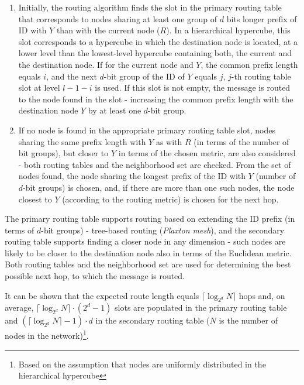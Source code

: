 \begin{enumerate}

\item Initially, the routing algorithm finds the slot in the primary routing table that corresponds to nodes sharing at least one group of $d$ bits longer prefix of ID with $Y$ than with the current node ($R$). In a hierarchical hypercube, this slot corresponds to a hypercube in which the destination node is located, at a lower level than the lowest-level hypercube containing both, the current and the destination node. If for the current node and $Y$, the common prefix length equals $i$, and the next $d$-bit group of the ID of $Y$ equals $j$, $j$-th routing table slot at level $l - 1 - i$ is used. If this slot is not empty, the message is routed to the node found in the slot - increasing the common prefix length with the destination node $Y$ by at least one $d$-bit group.

\item If no node is found in the appropriate primary routing table slot, nodes sharing the same prefix length with $Y$ as with $R$ (in terms of the number of bit groups), but closer to $Y$ in terms of the chosen metric, are also considered - both routing tables and the neighborhood set are checked. From the set of nodes found, the node sharing the longest prefix of the ID with $Y$ (number of $d$-bit groups) is chosen, and, if there are more than one such nodes, the node closest to $Y$ (according to the routing metric) is chosen for the next hop.

\end{enumerate}

The primary routing table supports routing based on extending the ID prefix (in terms of $d$-bit groups) - tree-based routing (\emph{Plaxton mesh}), and the secondary routing table supports finding a closer node in any dimension - such nodes are likely to be closer to the destination node also in terms of the Euclidean metric. Both routing tables and the neighborhood set are used for determining the best possible next hop, to which the message is routed.

It can be shown that the expected route length equals $\lceil\log_{2^d} N\rceil$ hops and, on average, $\lceil\log_{2^d} N\rceil \cdot (2^d-1)$ slots are populated in the primary routing table and $(\lceil\log_{2^d} N\rceil - 1) \cdot d$ in the secondary routing table ($N$ is the number of nodes in the network)\footnote{Based on the assumption that nodes are uniformly distributed in the hierarchical hypercube}.




